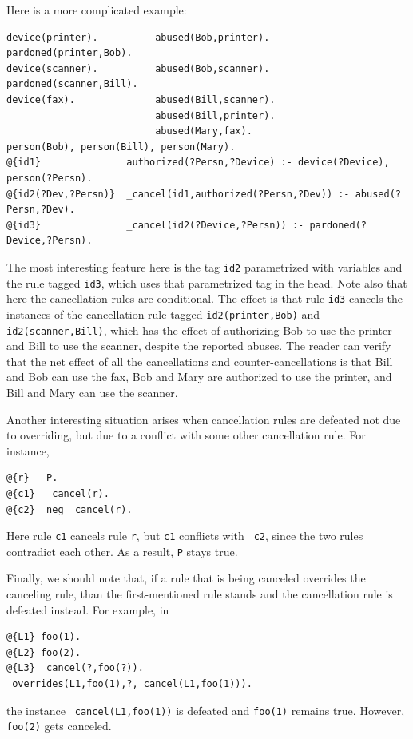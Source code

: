 \documentclass[11pt]{article}
\begin{document}
Here is a more complicated example:
\begin{verbatim}
device(printer).          abused(Bob,printer).       pardoned(printer,Bob).
device(scanner).          abused(Bob,scanner).       pardoned(scanner,Bill).
device(fax).              abused(Bill,scanner).
                          abused(Bill,printer).
                          abused(Mary,fax).
person(Bob), person(Bill), person(Mary).
@{id1}               authorized(?Persn,?Device) :- device(?Device), person(?Persn).
@{id2(?Dev,?Persn)}  _cancel(id1,authorized(?Persn,?Dev)) :- abused(?Persn,?Dev).
@{id3}               _cancel(id2(?Device,?Persn)) :- pardoned(?Device,?Persn).
\end{verbatim}
The most interesting feature here is the tag {\tt id2} parametrized with
variables and the rule tagged {\tt id3}, which uses that parametrized
tag in the head. Note also that here the cancellation rules are conditional.
The effect is that rule {\tt id3} cancels the instances 
of the cancellation rule tagged {\tt id2(printer,Bob)} and
{\tt id2(scanner,Bill)}, which has the effect of authorizing Bob to use the
printer and Bill to use the scanner, despite the reported abuses.  
The reader can verify that the net effect of all the cancellations and
counter-cancellations is that Bill and Bob can use the fax, Bob and Mary
are authorized to use the printer, and Bill and Mary can use the scanner.

Another interesting situation arises when cancellation rules are defeated
not due to overriding, but due to a conflict with some other cancellation
rule. For instance,
\begin{verbatim}
@{r}   P.
@{c1}  _cancel(r).
@{c2}  neg _cancel(r).
\end{verbatim}
Here rule {\tt c1} cancels rule {\tt r}, but {\tt c1} conflicts with {\tt
  c2}, since the two rules contradict each other. As a result, {\tt P}      
stays true.

Finally, we should note that, if a rule that is being canceled overrides
the canceling rule, than the first-mentioned rule stands and the
cancellation rule is defeated instead. For example, in
\begin{verbatim}
@{L1} foo(1).
@{L2} foo(2).
@{L3} _cancel(?,foo(?)).  
_overrides(L1,foo(1),?,_cancel(L1,foo(1))).
\end{verbatim}
the instance {\tt \_cancel(L1,foo(1))} is defeated and {\tt foo(1)}
remains true. However, {\tt foo(2)} gets canceled.
\end{document}
